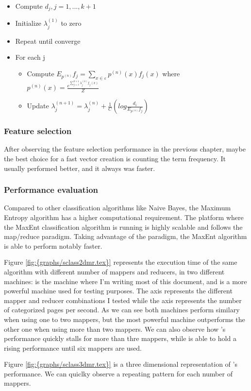\begin{itemize}
\item Compute $d_j, j=1,...,k+1$
\item Initialize $\lambda_j^{(1)}$ to zero
\item Repeat until converge
\item For each j 
  \begin{itemize}
  \item Compute $E_{p^{(n)}} f_j = \sum\limits_{x \in \varepsilon} p^{(n)} (x)f_j(x)$
    where $p^{(n)}(x) = \frac{e^{\sum\limits_{j=1}^{k+1}\lambda_j^{(n)}f_j(x)}}{Z}$ 
  \item Update $\lambda_j^{(n+1)} = \lambda_j^{(n)} + \frac{1}{C}(log\frac{d_i}{E_{{p^{(n)}}}f_j})$
  \end{itemize}
\end{itemize}

  

\subsubsection{Feature selection}
After observing the feature selection performance in the previous chapter, maybe the best choice for a fast vector creation is counting the term frequency. It usually performed better, and it always
was faster.


\subsubsection{Performance evaluation}
Compared to other classification algorithms like Naive Bayes, the Maximum Entropy algorithm has a higher computational requirement. 
The platform where the MaxEnt classification algorithm is running is highly scalable and follows the map/reduce paradigm. Taking advantage of the paradigm, the MaxEnt algorithm
is able to perform notably faster.



Figure \ref{fig:{graphs/sclass2dmr.tex}} represents the execution time of the same algorithm with different number of mappers and reducers, in two different machines:  
is the machine where I'm writing most of this document, and  is a more powerful machine used for testing purposes. The  axis represents the 
different mapper and reducer combinations I tested while the  axis represents the number of categorized pages per second.
As we can see both machines perform similary when using one to two mappers, but the most powerful machine outperforms the other one when using more than two mappers. We can also observe how 's performance
quickly stalls for more than thre mappers, while  is able to hold a rising performance until six mappers are used.

Figure \ref{fig:{graphs/sclass3dmr.tex}} is a three dimensional representation of 's performance. We can quiclky observe a repeating pattern for each number of mappers.

